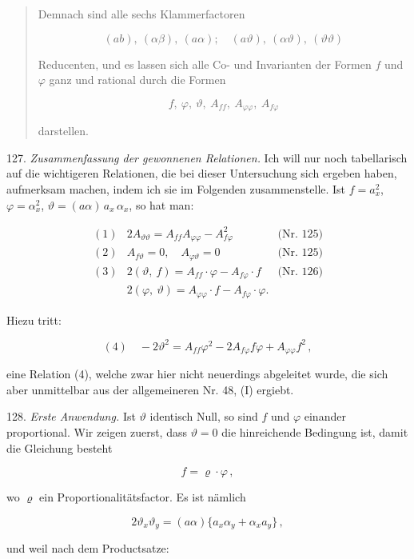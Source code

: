 \documentclass[11pt]{article}
\begin{document}
\begin{quote}
\glqq Demnach sind alle sechs Klammerfactoren

\[
(ab),\ (\alpha\beta),\ (a\alpha);\quad (a\vartheta),\ (\alpha\vartheta),\ (\vartheta\vartheta)
\]

Reducenten, und es lassen sich alle Co- und Invarianten der
Formen $f$ und $\varphi$ ganz und rational durch die Formen

\[
f,\ \varphi,\ \vartheta,\ A_{ff},\ A_{\varphi\varphi},\ A_{f\varphi}
\]

darstellen.\grqq{}
\end{quote}

127. \textit{Zusammenfassung der gewonnenen Relationen.} Ich will nur
noch tabellarisch auf die wichtigeren Relationen, die bei dieser Untersuchung sich ergeben haben, aufmerksam machen, indem ich sie im
Folgenden zusammenstelle. Ist $f = a_x^2$, $\varphi = \alpha_x^2$, $\vartheta = (a\alpha)\,a_x\,\alpha_x$, so
hat man:

\[
\begin{array}{rll}
(1) & 2A_{\vartheta\vartheta} = A_{ff}A_{\varphi\varphi} - A_{f\varphi}^2 & \text{(Nr. 125)} \\[4pt]
(2) & A_{f\vartheta} = 0,\quad A_{\varphi\vartheta} = 0 & \text{(Nr. 125)} \\[4pt]
(3) & 2(\vartheta,\ f) = A_{ff}\cdot\varphi - A_{f\varphi}\cdot f & \text{(Nr. 126)} \\[4pt]
    & 2(\varphi,\ \vartheta) = A_{\varphi\varphi}\cdot f - A_{f\varphi}\cdot\varphi. &
\end{array}
\]

Hiezu tritt:

\[
(4)\quad -2\vartheta^2 = A_{ff}\varphi^2 - 2A_{f\varphi}f\varphi + A_{\varphi\varphi}f^2\,,
\]

eine Relation (4), welche zwar hier nicht neuerdings abgeleitet wurde,
die sich aber unmittelbar aus der allgemeineren Nr. 48, (I) ergiebt.

128. \textit{Erste Anwendung.} Ist $\vartheta$ identisch Null, so sind $f$ und
$\varphi$ einander proportional. Wir zeigen zuerst, dass $\vartheta = 0$ die hinreichende Bedingung ist, damit die Gleichung besteht

\[
f = \varrho \cdot \varphi\,,
\]

wo $\varrho$ ein Proportionalitätsfactor. Es ist nämlich

\[
2\vartheta_x\vartheta_y = (a\alpha)\{a_x\alpha_y + \alpha_x a_y\}\,,
\]

und weil nach dem Productsatze:
\end{document}
